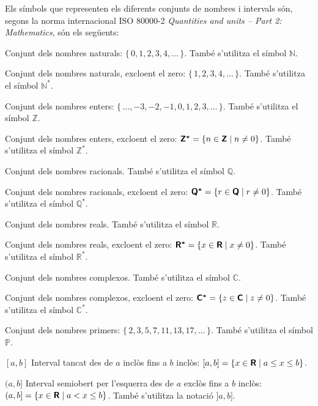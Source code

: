 \pagebreak

Els símbols que representen els diferents conjunts de nombres i intervals són, segons la norma internacional ISO 80000-2 \textit{Quantities and units -- Part 2: Mathematics}, són els següents:

\begin{list}{}
{\setlength{\labelwidth}{15mm} \setlength{\leftmargin}{20mm}
\setlength{\labelsep}{5mm}}
    \item[\mathsfb{N}] Conjunt dels nombres naturals: $\{\,0,1,2,3,4,\ldots\,\}$. També s'utilitza el símbol $\mathbb{N}$.
    \item[\mathsfb{N^*}] Conjunt dels nombres naturals, excloent el zero: $\{\,1,2,3,4,\ldots\,\}$. També s'utilitza el símbol $\mathbb{N^*}$.
    \item[\mathsfb{Z}] Conjunt dels nombres enters: $\{\,\ldots,-3,-2,-1,0,1,2,3,\ldots\,\}$.
     També s'utilitza el símbol $\mathbb{Z}$.
    \item[\mathsfb{Z^*}] Conjunt dels nombres enters, excloent el zero: ${\boldsymbol{\mathsf{Z^*}}} = \{ n \in {\ensuremath{\boldsymbol{\mathsf{Z}}}} \mid n \ne 0\}$. També s'utilitza el símbol $\mathbb{Z^*}$.
     \item[\mathsfb{Q}] Conjunt dels nombres racionals. També s'utilitza el símbol $\mathbb{Q}$.
     \item[\mathsfb{Q^*}] Conjunt dels nombres racionals, excloent el zero: ${\boldsymbol{\mathsf{Q^*}}} = \{ r \in {\ensuremath{\boldsymbol{\mathsf{Q}}}} \mid r \ne 0\}$. També s'utilitza el símbol $\mathbb{Q^*}$.
     \item[\mathsfb{R}] Conjunt dels nombres reals. També s'utilitza el símbol $\mathbb{R}$.
	 \item[\mathsfb{R^*}] Conjunt dels nombres reals, excloent el zero: ${\boldsymbol{\mathsf{R^*}}} = \{ x \in {\ensuremath{\boldsymbol{\mathsf{R}}}} \mid x \ne 0\}$. També s'utilitza el símbol $\mathbb{R^*}$.
     \item[\mathsfb{C}] Conjunt dels nombres complexos. També s'utilitza el símbol $\mathbb{C}$.
     \item[\mathsfb{C^*}] Conjunt dels nombres complexos, excloent el zero: ${\boldsymbol{\mathsf{C^*}}} = \{ z \in {\ensuremath{\boldsymbol{\mathsf{C}}}} \mid z \ne 0\}$. També s'utilitza el símbol $\mathbb{C^*}$.
     \item[\mathsfb{P}] Conjunt dels nombres primers: $\{\,2,3,5,7,11,13,17,\ldots\,\}$. També s'utilitza el símbol $\mathbb{P}$.
     \item[{$[a,b]$}] Interval tancat des de $a$ inclòs fins a $b$ inclòs: $[a,b] = \{x \in {\ensuremath{\boldsymbol{\mathsf{R}}}} \mid a \leq x \leq b\}$.
     \item[{$(a,b]$}] Interval semiobert per l'esquerra des de $a$ exclòs fins a $b$ inclòs: $(a,b] = \{x \in {\ensuremath{\boldsymbol{\mathsf{R}}}} \mid a < x \leq b\}$. També s'utilitza la notació $]a,b]$.

\end{list}

